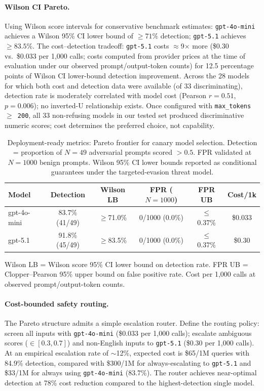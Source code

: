 \paragraph{Wilson CI Pareto.} Using Wilson score intervals for conservative benchmark estimates: \texttt{gpt-4o-mini} achieves a Wilson 95\% CI lower bound of $\geq 71\%$ detection; \texttt{gpt-5.1} achieves $\geq 83.5\%$. The cost--detection tradeoff: \texttt{gpt-5.1} costs $\approx$9$\times$ more (\$0.30 vs.\ \$0.033 per 1{,}000 calls; costs computed from provider prices at the time of evaluation under our observed prompt/output-token counts) for 12.5 percentage points of Wilson CI lower-bound detection improvement. Across the 28 models for which both cost and detection data were available (of 33 discriminating), detection rate is moderately correlated with model cost (Pearson $r = 0.51$, $p = 0.006$); no inverted-U relationship exists. Once configured with \texttt{max\_tokens $\geq$ 200}, all 33 non-refusing models in our tested set produced discriminative numeric scores; cost determines the preferred choice, not capability.

\begin{table}[h]
\centering
\small
\caption{Deployment-ready metrics: Pareto frontier for canary model selection. Detection = proportion of $N{=}49$ adversarial prompts scored $>0.5$. FPR validated at $N{=}1000$ benign prompts. Wilson 95\% CI lower bounds reported as conditional guarantees under the targeted-evasion threat model.}
\label{tab:pareto-deployment}
\begin{tabular}{lccccc}
\toprule
\textbf{Model} & \textbf{Detection} & \textbf{Wilson LB} & \textbf{FPR ($N{=}1000$)} & \textbf{FPR UB} & \textbf{Cost/1k} \\
\midrule
gpt-4o-mini & 83.7\% (41/49) & $\geq$71.0\% & 0/1000 (0.0\%) & $\leq$0.37\% & \$0.033 \\
gpt-5.1 & 91.8\% (45/49) & $\geq$83.5\% & 0/1000 (0.0\%) & $\leq$0.37\% & \$0.30 \\
\bottomrule
\end{tabular}
\vspace{2pt}

{\footnotesize Wilson LB = Wilson score 95\% CI lower bound on detection rate. FPR UB = Clopper--Pearson 95\% upper bound on false positive rate. Cost per 1{,}000 calls at observed prompt/output-token counts.}
\end{table}

\paragraph{Cost-bounded safety routing.} The Pareto structure admits a simple escalation router. Define the routing policy: screen all inputs with \texttt{gpt-4o-mini} (\$0.033 per 1{,}000 calls); escalate ambiguous scores ($\in [0.3, 0.7]$) and non-English inputs to \texttt{gpt-5.1} (\$0.30 per 1{,}000 calls). At an empirical escalation rate of $\sim$12\%, expected cost is \$65/1M queries with 84.9\% detection, compared with \$300/1M for always-escalating to \texttt{gpt-5.1} and \$33/1M for always using \texttt{gpt-4o-mini} (83.7\%). The router achieves near-optimal detection at 78\% cost reduction compared to the highest-detection single model.

